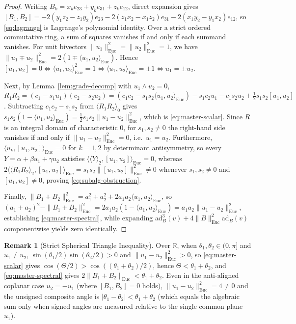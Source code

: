 \documentclass[11pt]{article}
\theoremstyle{definition}
\newtheorem{remark}[theorem]{Remark}
\newcommand{\ad}{\mathrm{ad}}
\newcommand{\Euc}{\mathrm{Euc}}
\newcommand{\grade}[2]{\langle #1 \rangle_{#2}}
\begin{document}
\begin{proof}
Writing $B_k = x_k e_{23} + y_k e_{31} + z_k e_{12}$, direct expansion gives
$[B_1, B_2] = -2(y_1 z_2 - z_1 y_2)e_{23} - 2(z_1 x_2 - x_1 z_2)e_{31}
- 2(x_1 y_2 - y_1 x_2)e_{12}$, so \eqref{eq:lagrange} is Lagrange's polynomial identity. Over a
strict ordered commutative ring, a sum of squares vanishes if and only if each summand vanishes.
For unit bivectors $\|u_1\|_{\Euc}^2 = \|u_2\|_{\Euc}^2 = 1$, we have
$\|u_1 \mp u_2\|_{\Euc}^2 = 2(1 \mp \langle u_1, u_2 \rangle_{\Euc})$. Hence $[u_1, u_2] = 0
\iff \langle u_1, u_2 \rangle_{\Euc}^2 = 1 \iff \langle u_1, u_2 \rangle_{\Euc} = \pm 1 \iff
u_1 = \pm u_2$.

Next, by Lemma~\ref{lem:grade-decomp} with $u_1 \wedge u_2 = 0$,
$R_1 R_2 = (c_1 - s_1 u_1)(c_2 - s_2 u_2) = (c_1 c_2 - s_1 s_2 \langle u_1, u_2 \rangle_{\Euc})
- s_1 c_2 u_1 - c_1 s_2 u_2 + \frac{1}{2} s_1 s_2 [u_1, u_2]$.
Subtracting $c_1 c_2 - s_1 s_2$ from $\grade{R_1 R_2}{0}$ gives
$s_1 s_2 (1 - \langle u_1, u_2 \rangle_{\Euc}) = \frac{1}{2} s_1 s_2 \|u_1 - u_2\|_{\Euc}^2$,
which is \eqref{eq:master-scalar}. Since $R$ is an integral domain of characteristic $0$,
for $s_1, s_2 \neq 0$ the right-hand side vanishes if and only if $\|u_1 - u_2\|_{\Euc}^2 = 0$,
i.e.\ $u_1 = u_2$. Furthermore, $\langle u_k, [u_1, u_2] \rangle_{\Euc} = 0$ for $k = 1, 2$ by
determinant antisymmetry, so every $Y = \alpha + \beta u_1 + \gamma u_2$ satisfies
$\langle \grade{Y}{2}, [u_1, u_2] \rangle_{\Euc} = 0$, whereas
$2\langle \grade{R_1 R_2}{2}, [u_1, u_2] \rangle_{\Euc} = s_1 s_2 \|[u_1, u_2]\|_{\Euc}^2 \neq 0$
whenever $s_1, s_2 \neq 0$ and $[u_1, u_2] \neq 0$, proving \eqref{eq:subalg-obstruction}.

Finally, $\|B_1 + B_2\|_{\Euc}^2 = a_1^2 + a_2^2 + 2 a_1 a_2 \langle u_1, u_2 \rangle_{\Euc}$,
so $(a_1 + a_2)^2 - \|B_1 + B_2\|_{\Euc}^2 = 2 a_1 a_2(1 - \langle u_1, u_2 \rangle_{\Euc})
= a_1 a_2 \|u_1 - u_2\|_{\Euc}^2$, establishing \eqref{eq:master-spectral}, while expanding
$\ad_B^3(v) + 4\|B\|_{\Euc}^2 \ad_B(v)$ componentwise yields zero identically.
\end{proof}

\begin{remark}[Strict Spherical Triangle Inequality]
Over $\mathbb{R}$, when $\theta_1, \theta_2 \in (0, \pi]$ and $u_1 \neq u_2$,
$\sin(\theta_1/2)\sin(\theta_2/2) > 0$ and $\|u_1 - u_2\|_{\Euc}^2 > 0$, so
\eqref{eq:master-scalar} gives $\cos(\Theta/2) > \cos((\theta_1 + \theta_2)/2)$, hence
$\Theta < \theta_1 + \theta_2$, and \eqref{eq:master-spectral} gives
$2\|B_1 + B_2\|_{\Euc} < \theta_1 + \theta_2$. Even in the anti-aligned coplanar case
$u_2 = -u_1$ (where $[B_1, B_2] = 0$ holds), $\|u_1 - u_2\|_{\Euc}^2 = 4 \neq 0$ and the
unsigned composite angle is $|\theta_1 - \theta_2| < \theta_1 + \theta_2$ (which equals the
algebraic sum only when signed angles are measured relative to the single common plane $u_1$).
\end{remark}
\end{document}
